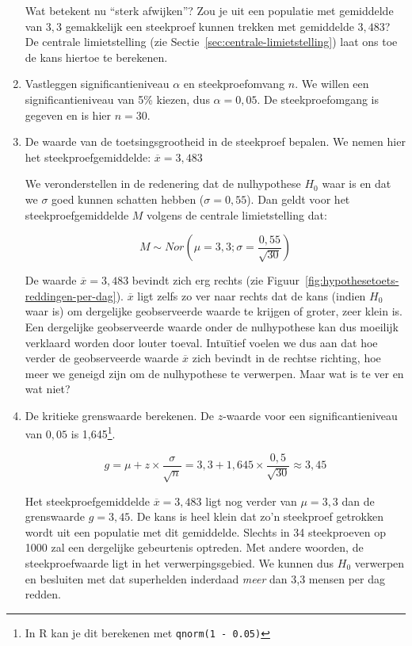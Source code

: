\begin{example}
\begin{enumerate}
    Wat betekent nu ``sterk afwijken''? Zou je uit een populatie met gemiddelde van $3,3$ gemakkelijk een steekproef kunnen trekken met gemiddelde $3,483$? De centrale limietstelling (zie Sectie~\ref{sec:centrale-limietstelling}) laat ons toe de kans hiertoe te berekenen.
    
    \item Vastleggen significantieniveau $\alpha$ en steekproefomvang $n$. We willen een significantieniveau van 5\% kiezen, dus $\alpha = 0,05$. De steekproefomgang is gegeven en is hier $n = 30$.
    
    \item De waarde van de toetsingsgrootheid in de steekproef bepalen. We nemen hier het steekproefgemiddelde: $\overline{x} = 3,483$
    
    We veronderstellen in de redenering dat de nulhypothese $H_{0}$ waar is en dat we $\sigma$ goed kunnen schatten hebben ($\sigma = 0,55$). Dan geldt voor het steekproefgemiddelde $M$ volgens de centrale limietstelling dat:
    
    \[M \sim  Nor(\mu = 3,3; \sigma = \frac{0,55}{\sqrt{30}})\]
    
    De waarde $\overline{x} = 3,483$ bevindt zich erg rechts (zie Figuur~\ref{fig:hypothesetoets-reddingen-per-dag}). $\overline{x}$ ligt zelfs zo ver naar rechts dat de kans (indien $H_{0}$ waar is) om dergelijke geobserveerde waarde te krijgen of groter, zeer klein is. Een dergelijke geobserveerde waarde onder de nulhypothese kan dus moeilijk verklaard worden door louter toeval. Intu\"itief voelen we dus aan dat hoe verder de geobserveerde waarde $\overline{x}$ zich bevindt in de rechtse richting, hoe meer we geneigd zijn om de nulhypothese te verwerpen. Maar wat is te ver en wat niet?
    
    \item De kritieke grenswaarde berekenen. De $z$-waarde voor een significantieniveau van $0,05$ is 1,645\footnote{In R kan je dit berekenen met \texttt{qnorm(1 - 0.05)}}.
    
    \[ g = \mu + z \times \frac{\sigma}{\sqrt{n}} = 3,3 + 1,645 \times \frac{0,5}{\sqrt{30}} \approx 3,45 \]
    
    Het steekproefgemiddelde $\overline{x} = 3,483$ ligt nog verder van $\mu = 3,3$ dan de grenswaarde $g = 3,45$. De kans is heel klein dat zo'n steekproef getrokken wordt uit een populatie met dit gemiddelde. Slechts in 34 steekproeven op 1000 zal een dergelijke gebeurtenis optreden. Met andere woorden, de steekproefwaarde ligt in het verwerpingsgebied. We kunnen dus $H_0$ verwerpen en besluiten met dat superhelden inderdaad \emph{meer} dan 3,3 mensen per dag redden.
  \end{enumerate}

\end{example}

